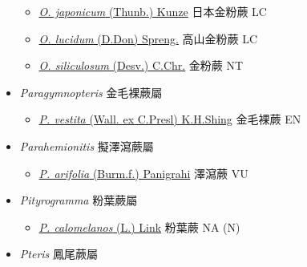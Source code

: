 \begin{itemize}
  \begin{itemize}
        \item[] \href{http://www.theplantlist.org/tpl1.1/search?q=Onychium+japonicum}{\textit{O. japonicum} (Thunb.) Kunze}   日本金粉蕨   LC
        \item[] \href{http://www.theplantlist.org/tpl1.1/search?q=Onychium+lucidum}{\textit{O. lucidum} (D.Don) Spreng.}   高山金粉蕨   LC
        \item[] \href{http://www.theplantlist.org/tpl1.1/search?q=Onychium+siliculosum}{\textit{O. siliculosum} (Desv.) C.Chr.}   金粉蕨   NT
  \end{itemize}
 \item[    ] \textit{Paragymnopteris} 金毛裸蕨屬
                                
  \begin{itemize}
        \item[] \href{http://www.theplantlist.org/tpl1.1/search?q=Paragymnopteris+vestita}{\textit{P. vestita} (Wall. ex C.Presl) K.H.Shing}   金毛裸蕨   EN
  \end{itemize}
 \item[    ] \textit{Parahemionitis} 擬澤瀉蕨屬
                                
  \begin{itemize}
        \item[] \href{http://www.theplantlist.org/tpl1.1/search?q=Parahemionitis+arifolia}{\textit{P. arifolia} (Burm.f.) Panigrahi}   澤瀉蕨   VU
  \end{itemize}
 \item[    ] \textit{Pityrogramma} 粉葉蕨屬
                                
  \begin{itemize}
        \item[] \href{http://www.theplantlist.org/tpl1.1/search?q=Pityrogramma+calomelanos}{\textit{P. calomelanos} (L.) Link}   粉葉蕨   NA (N)
  \end{itemize}
 \item[    ] \textit{Pteris} 鳳尾蕨屬
                                

\end{itemize}
